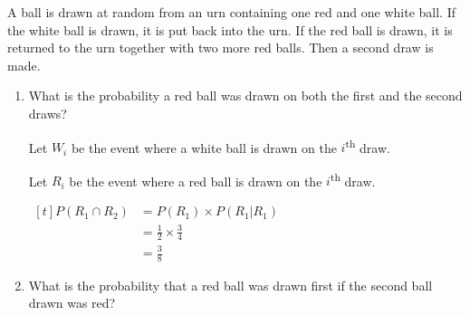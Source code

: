 \begin{example}
    A ball is drawn at random from an urn containing one red and one white ball. If the white ball is drawn, it is put back into the urn. If the red ball is drawn, it is returned to the urn together with two more red balls. Then a second draw is made.

    \begin{enumerate}[label=\alph*)]
        \item What is the probability a red ball was drawn on both the first and the second draws?

        Let $W_i$ be the event where a white ball is drawn on the $i$\textsuperscript{th} draw. 

        Let $R_i$ be the event where a red ball is drawn on the $i$\textsuperscript{th} draw. 

        $\begin{aligned}[t]
            P(R_1 \cap R_2) & = P(R_1) \times P(R_1 | R_1)     \\
                            & = \frac{1}{2} \times \frac{3}{4} \\
                            & = \frac{3}{8}
        \end{aligned}$

        \item What is the probability that a red ball was drawn first if the second ball drawn was red?


\end{enumerate}
\end{example}

